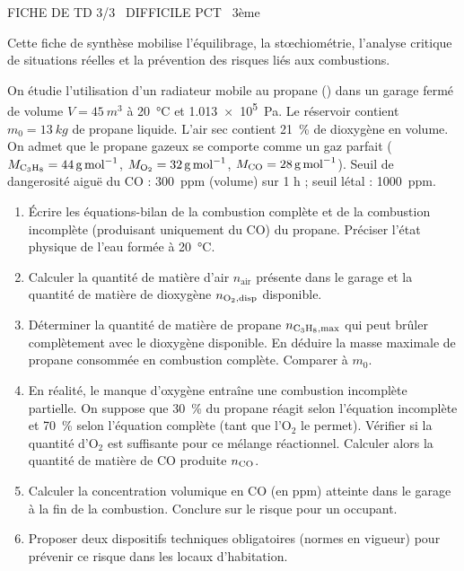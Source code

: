 \documentclass[11pt]{article}
\begin{document}
\begin{tcolorbox}[enhanced,colback=popink,colframe=popink,arc=10pt,boxrule=0pt,left=12pt,right=12pt,top=9pt,bottom=9pt]
{\color{white}\popxbold\small FICHE DE TD 3/3 \textbullet\ DIFFICILE \hfill PCT \textbullet\ 3ème\par}
\end{tcolorbox}
\vspace{4pt}
Cette fiche de synthèse mobilise l'équilibrage, la stœchiométrie, l'analyse critique de situations réelles et la prévention des risques liés aux combustions.

\begin{exercice}
On étudie l'utilisation d'un radiateur mobile au propane () dans un garage fermé de volume $V = \SI{45}{m^3}$ à \SI{20}{\celsius} et \SI{1,013e5}{Pa}. Le réservoir contient $m_0 = \SI{13}{kg}$ de propane liquide. L'air sec contient \SI{21}{\%} de dioxygène en volume. On admet que le propane gazeux se comporte comme un gaz parfait ($M_{\ce{C3H8}} = \SI{44}{g.mol^{-1}}$, $M_{\ce{O2}} = \SI{32}{g.mol^{-1}}$, $M_{\ce{CO}} = \SI{28}{g.mol^{-1}}$). Seuil de dangerosité aiguë du CO : \SI{300}{ppm} (volume) sur 1 h ; seuil létal : \SI{1000}{ppm}.
\begin{enumerate}
    \item Écrire les équations-bilan de la combustion complète et de la combustion incomplète (produisant uniquement du CO) du propane. Préciser l'état physique de l'eau formée à \SI{20}{\celsius}.
    \item Calculer la quantité de matière d'air $n_{\text{air}}$ présente dans le garage et la quantité de matière de dioxygène $n_{\ce{O2},\text{disp}}$ disponible.
    \item Déterminer la quantité de matière de propane $n_{\ce{C3H8},\text{max}}$ qui peut brûler complètement avec le dioxygène disponible. En déduire la masse maximale de propane consommée en combustion complète. Comparer à $m_0$.
    \item En réalité, le manque d'oxygène entraîne une combustion incomplète partielle. On suppose que \SI{30}{\%} du propane réagit selon l'équation incomplète et \SI{70}{\%} selon l'équation complète (tant que l'O$_2$ le permet). Vérifier si la quantité d'O$_2$ est suffisante pour ce mélange réactionnel. Calculer alors la quantité de matière de CO produite $n_{\ce{CO}}$.
    \item Calculer la concentration volumique en CO (en ppm) atteinte dans le garage à la fin de la combustion. Conclure sur le risque pour un occupant.
    \item Proposer deux dispositifs techniques obligatoires (normes en vigueur) pour prévenir ce risque dans les locaux d'habitation.
\end{enumerate}
\end{exercice}
\end{document}
